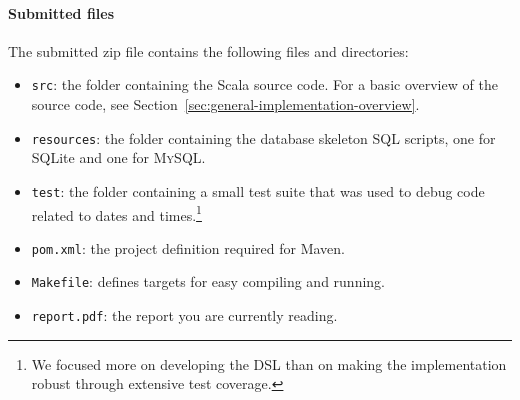\documentclass[a4paper]{article}
\newcommand{\cc}[1]{\texttt{#1}}
\begin{document}
\paragraph{Submitted files}
The submitted zip file contains the following files and directories:

\begin{itemize}
\item \cc{src}: the folder containing the Scala source code.
  For a basic overview of the source code, see Section~\ref{sec:general-implementation-overview}.
\item \cc{resources}: the folder containing the database skeleton SQL scripts, one for SQLite and one for \textsc{MySQL}\@.
\item \cc{test}: the folder containing a small test suite that was used to debug code related to dates and times.\footnote{We focused more on developing the DSL than on making the implementation robust through extensive test coverage.}
\item \cc{pom.xml}: the project definition required for Maven.
\item \cc{Makefile}: defines targets for easy compiling and running.
\item \cc{report.pdf}: the report you are currently reading.
\end{itemize}
\end{document}
